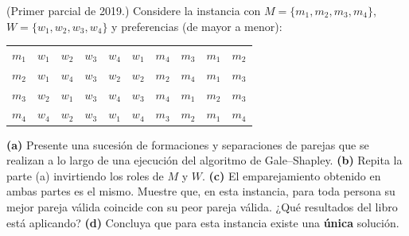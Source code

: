 \begin{enunciado}
(Primer parcial de 2019.) Considere la instancia con $M=\{m_1,m_2,m_3,m_4\}$,
$W=\{w_1,w_2,w_3,w_4\}$ y preferencias (de mayor a menor):
\begin{center}
\begin{tabular}{l@{\quad}llll@{\qquad\qquad}l@{\quad}llll}
$m_1$ & $w_1$ & $w_2$ & $w_3$ & $w_4$ & $w_1$ & $m_4$ & $m_3$ & $m_1$ & $m_2$\\
$m_2$ & $w_1$ & $w_4$ & $w_3$ & $w_2$ & $w_2$ & $m_2$ & $m_4$ & $m_1$ & $m_3$\\
$m_3$ & $w_2$ & $w_1$ & $w_3$ & $w_4$ & $w_3$ & $m_4$ & $m_1$ & $m_2$ & $m_3$\\
$m_4$ & $w_4$ & $w_2$ & $w_3$ & $w_1$ & $w_4$ & $m_3$ & $m_2$ & $m_1$ & $m_4$
\end{tabular}
\end{center}
\textbf{(a)} Presente una sucesión de formaciones y separaciones de parejas que se realizan a
lo largo de una ejecución del algoritmo de Gale--Shapley.
\textbf{(b)} Repita la parte (a) invirtiendo los roles de $M$ y $W$.
\textbf{(c)} El emparejamiento obtenido en ambas partes es el mismo. Muestre que, en esta
instancia, para toda persona su mejor pareja válida coincide con su peor pareja válida. ¿Qué
resultados del libro está aplicando?
\textbf{(d)} Concluya que para esta instancia existe una \textbf{única} solución.
\end{enunciado}


